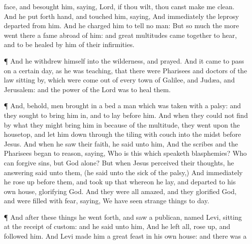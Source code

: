 {face, and
besought
him,
saying,
Lord,
if thou
wilt, thou
canst
make
me
clean.
And he put
forth
{}
hand, and
touched
him,
saying,
{}
And
immediately the
leprosy
departed
from
him.
And
he
charged
him to
tell no
man:
{}
But so much the
more went
there a
fame
abroad
of
him:
and
great
multitudes came
together to
hear,
and to be
healed
by
him
of
their
infirmities.
\par }{\PP {}¶
And he
withdrew
himself
into the
wilderness,
and
prayed.
And it came to
pass
on a
certain
day,
as
he
was
teaching,
that there
were
Pharisees
and doctors of the
law sitting
by,
which
were
come
out of
every
town of
Galilee,
and
Judæa,
and
Jerusalem:
and the
power of the
Lord
was
{}
to
heal
them.
\par }{\PP {}¶
And,
behold,
men
brought
in a
bed a
man
which
was taken with a
palsy:
and they
sought
{} to
bring
him
in,
and to
lay
{}
before
him.
And when they
could
not
find
by
what
{} they might
bring
him
in because
of the
multitude, they
went
upon the
housetop, and
let
him
down
through the
tiling
with
{}
couch
into the
midst
before
Jesus.
And when he
saw
their
faith, he
said unto
him,
{}
And the
scribes
and the
Pharisees
began to
reason,
saying,
Who
is
this
which
speaketh
blasphemies?
Who
can
forgive
sins,
but
God
alone?
But
when
Jesus
perceived
their
thoughts, he
answering
said
unto
them,
{}
 (he
said unto the sick of the
palsy,)
{}
And
immediately he rose
up
before
them, and
took
up
that whereon he
lay, and
departed
to his
own
house,
glorifying
God.
And they
were
all
amazed,
and they
glorified
God,
and were
filled with
fear,
saying, We have
seen strange
things to
day.
\par }{\PP {}¶
And
after these
things he went
forth,
and
saw a
publican,
named
Levi,
sitting
at the receipt of
custom:
and he
said unto
him,
{}
And he
left
all, rose
up, and
followed
him.
And
Levi
made
him a
great
feast
in his
own
house:
and there
was a
}
